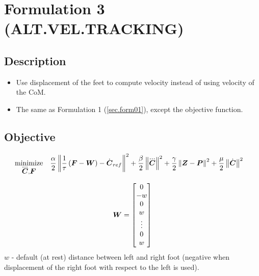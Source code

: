 \section{Formulation 3 (ALT.VEL.TRACKING)}\label{sec.form03}


\subsection{Description}
\begin{itemize}
    \item Use displacement of the feet to compute velocity instead of using velocity of the CoM.
    \item The same as Formulation 1 (\ref{sec.form01}), except the objective function.
\end{itemize}



\subsection{Objective}
\begin{equation*}
\begin{split}
    \minimize{\cJerk, \FD}  & \frac{\alpha}{2} \norm{\frac{1}{\tau}\left(\FD - \V{W}\right) - \cVel_{ref}}^2 + 
                              \frac{\beta}{2} \norm{\cJerk}^2 +
                              \frac{\gamma}{2} \norm{\ZMP - \FP}^2 +
                              \frac{\mu}{2} \norm{\cVel}^2
\end{split}
\end{equation*}

\begin{equation*}
\mbox{\boldmath $W$} = 
\begin{bmatrix}
    0 \\
    -w \\
    0 \\
    w \\
    \vdots \\
    0 \\
    w \\
\end{bmatrix}
\end{equation*}
$w$ - default (at rest) distance between left and right foot (negative when displacement of the right foot
with respect to the left is used).

